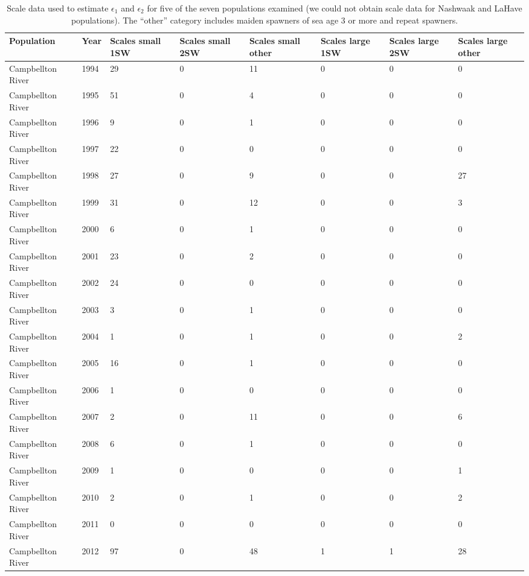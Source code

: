 \begingroup\footnotesize
\begin{longtable}{p{3cm}p{1cm}p{1.3cm}p{1.3cm}p{1.3cm}p{1.3cm}p{1.3cm}p{1.3cm}}
\caption{Scale data used to estimate $\epsilon_{1}$ 
                    and $\epsilon_{2}$ for five of the seven populations examined (we could not obtain
                    scale data for Nashwaak and LaHave populations). The ``other'' category includes
                    maiden spawners of sea age 3 or more and repeat spawners.} \\ 
  \hline
Population & Year & Scales small 1SW & Scales small 2SW & Scales small other & Scales large 1SW & Scales large 2SW & Scales large other \\ 
  \hline
Campbellton River & 1994 & 29 & 0 & 11 & 0 & 0 & 0 \\ 
  Campbellton River & 1995 & 51 & 0 & 4 & 0 & 0 & 0 \\ 
  Campbellton River & 1996 & 9 & 0 & 1 & 0 & 0 & 0 \\ 
  Campbellton River & 1997 & 22 & 0 & 0 & 0 & 0 & 0 \\ 
  Campbellton River & 1998 & 27 & 0 & 9 & 0 & 0 & 27 \\ 
  Campbellton River & 1999 & 31 & 0 & 12 & 0 & 0 & 3 \\ 
  Campbellton River & 2000 & 6 & 0 & 1 & 0 & 0 & 0 \\ 
  Campbellton River & 2001 & 23 & 0 & 2 & 0 & 0 & 0 \\ 
  Campbellton River & 2002 & 24 & 0 & 0 & 0 & 0 & 0 \\ 
  Campbellton River & 2003 & 3 & 0 & 1 & 0 & 0 & 0 \\ 
  Campbellton River & 2004 & 1 & 0 & 1 & 0 & 0 & 2 \\ 
  Campbellton River & 2005 & 16 & 0 & 1 & 0 & 0 & 0 \\ 
  Campbellton River & 2006 & 1 & 0 & 0 & 0 & 0 & 0 \\ 
  Campbellton River & 2007 & 2 & 0 & 11 & 0 & 0 & 6 \\ 
  Campbellton River & 2008 & 6 & 0 & 1 & 0 & 0 & 0 \\ 
  Campbellton River & 2009 & 1 & 0 & 0 & 0 & 0 & 1 \\ 
  Campbellton River & 2010 & 2 & 0 & 1 & 0 & 0 & 2 \\ 
  Campbellton River & 2011 & 0 & 0 & 0 & 0 & 0 & 0 \\ 
  Campbellton River & 2012 & 97 & 0 & 48 & 1 & 1 & 28 \\ 

\end{longtable}
